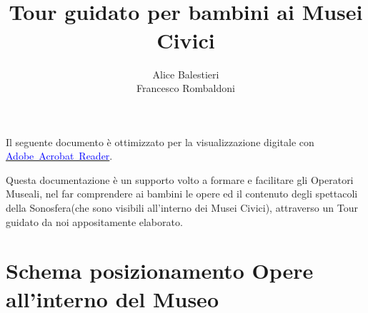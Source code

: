 \documentclass[hidelinks,12pt,a4paper]{article}
\begin{document}
	\begin{flushleft}

		\title{\textbf{\\Tour guidato per bambini ai Musei Civici}}
		\author{Alice Balestieri\\Francesco Rombaldoni}
		\date{}

		\maketitle
		
		\begin{adjustwidth}{-30mm}{-30mm}
			\vspace*{\fill}
			\centering
			\fboxrule=2pt
			\fbox
			{
				\begin{minipage}{0.85\linewidth}
					Il seguente documento è ottimizzato per la visualizzazione digitale con \href{https://get.adobe.com/it/reader/}{\textcolor{blue}{Adobe~Acrobat~Reader}}.  
				\end{minipage}
			}
		\end{adjustwidth}
		
		\setcounter{page}{1}
		\newpage
		\vspace*{\fill}
		Questa documentazione è un supporto volto a formare e facilitare gli Operatori Museali, nel far comprendere ai bambini le opere ed il contenuto degli spettacoli della Sonosfera(che sono visibili all'interno dei Musei Civici), attraverso un Tour guidato da noi appositamente elaborato.
		\vspace*{\fill}
        \newpage
        \tableofcontents
        \newpage
        
		\section{Schema posizionamento Opere all'interno del Museo}

		\begin{center}
		\end{center}


\end{flushleft}
\end{document}
